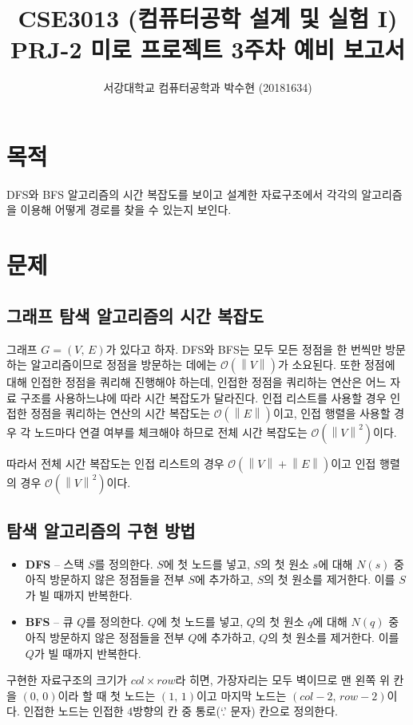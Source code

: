 
\newcommand{\norm}[1]{\left\lVert#1\right\rVert}



\title{CSE3013 (컴퓨터공학 설계 및 실험 I) \space \newline PRJ-2 미로 프로젝트 3주차 예비 보고서}
\author{서강대학교 컴퓨터공학과 박수현 (20181634)}
\maketitle

\section{목적}
DFS와 BFS 알고리즘의 시간 복잡도를 보이고 설계한 자료구조에서 각각의 알고리즘을 이용해 어떻게 경로를 찾을 수 있는지 보인다.

\section{문제}
\subsection{그래프 탐색 알고리즘의 시간 복잡도}

그래프 $G = \left(V,\,E\right)$가 있다고 하자. DFS와 BFS는 모두 모든 정점을 한 번씩만 방문하는 알고리즘이므로 정점을 방문하는 데에는
$\mathcal{O}\left(\norm{V}\right)$가 소요된다. 또한 정점에 대해 인접한 정점을 쿼리해 진행해야 하는데, 인접한 정점을 쿼리하는 연산은
어느 자료 구조를 사용하느냐에 따라 시간 복잡도가 달라진다. 인접 리스트를 사용할 경우 인접한 정점을 쿼리하는 연산의 시간 복잡도는
$\mathcal{O}\left(\norm{E}\right)$이고, 인접 행렬을 사용할 경우 각 노드마다 연결 여부를 체크해야 하므로 전체 시간 복잡도는
$\mathcal{O}\left(\norm{V}^2\right)$이다.

따라서 전체 시간 복잡도는 인접 리스트의 경우 $\mathcal{O}\left(\norm{V}+\norm{E}\right)$이고 인접 행렬의 경우
$\mathcal{O}\left(\norm{V}^2\right)$이다.

\subsection{탐색 알고리즘의 구현 방법}

\begin{itemize}
    \item \textbf{DFS} -- 스택 $S$를 정의한다. $S$에 첫 노드를 넣고,
    $S$의 첫 원소 $s$에 대해 $N\left(s\right)$ 중 아직 방문하지 않은 정점들을 전부 $S$에 추가하고,
    $S$의 첫 원소를 제거한다. 이를 $S$가 빌 때까지 반복한다. 
    \item \textbf{BFS} -- 큐 $Q$를 정의한다. $Q$에 첫 노드를 넣고,
    $Q$의 첫 원소 $q$에 대해 $N\left(q\right)$ 중 아직 방문하지 않은 정점들을 전부 $Q$에 추가하고,
    $Q$의 첫 원소를 제거한다. 이를 $Q$가 빌 때까지 반복한다. 
\end{itemize}

구현한 자료구조의 크기가 $col \times row$라 히면, 가장자리는 모두 벽이므로 맨 왼쪽 위 칸을 $\left(0,\,0\right)$이라 할 때
첫 노드는 $\left(1,\,1\right)$이고 마지막 노드는 $\left(col - 2,\,row - 2\right)$이다. 인접한 노드는 인접한 4방향의
칸 중 통로(`.' 문자) 칸으로 정의한다.


